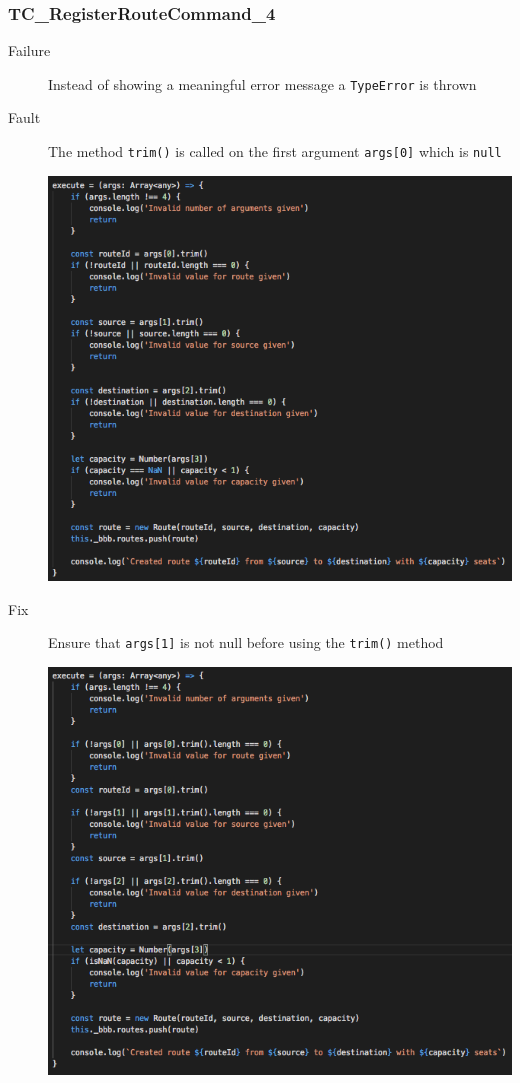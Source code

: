\documentclass[11pt]{article}
\begin{document}
\subsubsection{TC\_RegisterRouteCommand\_4}
\label{sec:org485b9bf}

\begin{description}
\item[{Failure}] Instead of showing a meaningful error message a \texttt{TypeError} is thrown
\item[{Fault}] The method \texttt{trim()} is called on the first argument \texttt{args[0]} which is \texttt{null}
\begin{center}
\includegraphics[width=.9\linewidth]{./Iteration3.rtfd/Pasted Graphic 7.tiff.png}
\end{center}
\item[{Fix}] Ensure that \texttt{args[1]} is not null before using the \texttt{trim()} method
\begin{center}
\includegraphics[width=.9\linewidth]{./Iteration3.rtfd/Pasted Graphic 14.tiff.png}
\end{center}
\end{description}
\end{document}
